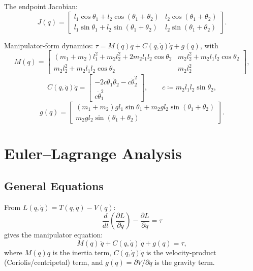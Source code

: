 \documentclass[11pt]{article}
\begin{document}
The endpoint Jacobian:
\begin{equation}\label{eq:dp-jacobian}
J(q) = \begin{bmatrix}
l_1\cos\theta_1 + l_2\cos(\theta_1+\theta_2) & l_2\cos(\theta_1+\theta_2) \\
l_1\sin\theta_1 + l_2\sin(\theta_1+\theta_2) & l_2\sin(\theta_1+\theta_2)
\end{bmatrix}.
\end{equation}

Manipulator-form dynamics: $\tau = M(q)\ddot{q} + C(q,\dot{q})\dot{q} + g(q)$, with
\begin{equation}\label{eq:dp-mass}
M(q) = \begin{bmatrix}
(m_1+m_2)l_1^2 + m_2l_2^2 + 2m_2l_1l_2\cos\theta_2 & m_2l_2^2+m_2l_1l_2\cos\theta_2 \\
m_2l_2^2+m_2l_1l_2\cos\theta_2 & m_2l_2^2
\end{bmatrix},
\end{equation}
\begin{equation}\label{eq:dp-coriolis}
C(q,\dot{q})\dot{q} = \begin{bmatrix}
-2c\dot\theta_1\dot\theta_2 - c\dot\theta_2^2 \\
c\dot\theta_1^2
\end{bmatrix}, \qquad
c \coloneqq m_2l_1l_2\sin\theta_2,
\end{equation}
\begin{equation}\label{eq:dp-gravity}
g(q) = \begin{bmatrix}
(m_1+m_2)gl_1\sin\theta_1 + m_2gl_2\sin(\theta_1+\theta_2) \\
m_2gl_2\sin(\theta_1+\theta_2)
\end{bmatrix}.
\end{equation}


\section{Euler--Lagrange Analysis}\label{sec:euler-lagrange}

\subsection{General Equations}

From $L(q,\dot{q}) = T(q,\dot{q}) - V(q)$:
\begin{equation}\label{eq:el-general}
\frac{d}{dt}\left(\frac{\partial L}{\partial \dot{q}}\right) - \frac{\partial L}{\partial q} = \tau
\end{equation}
gives the manipulator equation:
\begin{equation}\label{eq:el-manipulator}
M(q)\,\ddot{q} + C(q,\dot{q})\,\dot{q} + g(q) = \tau,
\end{equation}
where $M(q)\ddot{q}$ is the inertia term, $C(q,\dot{q})\dot{q}$ is the velocity-product (Coriolis/centripetal) term, and $g(q) = \partial V/\partial q$ is the gravity term.
\end{document}
